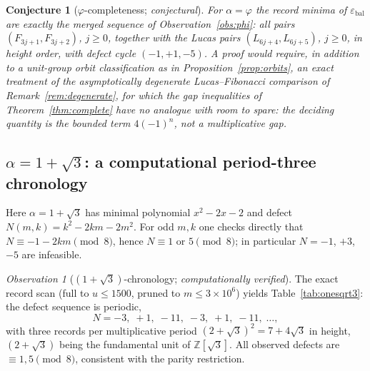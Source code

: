 \documentclass[11pt]{article}
\newtheorem{conjecture}[theorem]{Conjecture}
\theoremstyle{definition}
\theoremstyle{remark}
\newtheorem{observation}[theorem]{Observation}
\newcommand{\eb}{\varepsilon_{\mathrm{bal}}}
\newcommand{\ZZ}{\mathbb{Z}}
\begin{document}
\begin{conjecture}[$\varphi$-completeness; \emph{conjectural}]\label{conj:phi}
For $\alpha=\varphi$ the record minima of $\eb$ are exactly the merged sequence of Observation~\ref{obs:phi}: all pairs $(F_{3j+1},F_{3j+2})$, $j\ge0$, together with the Lucas pairs $(L_{6j+4},L_{6j+5})$, $j\ge0$, in height order, with defect cycle $(-1,+1,-5)$. A proof would require, in addition to a unit-group orbit classification as in Proposition~\ref{prop:orbits}, an exact treatment of the asymptotically degenerate Lucas--Fibonacci comparison of Remark~\ref{rem:degenerate}, for which the gap inequalities of Theorem~\ref{thm:complete} have no analogue with room to spare: the deciding quantity is the bounded term $4(-1)^n$, not a multiplicative gap.
\end{conjecture}

\subsection{$\alpha=1+\sqrt3$: a computational period-three chronology}\label{sec:onesqrt3}

Here $\alpha=1+\sqrt3$ has minimal polynomial $x^2-2x-2$ and defect $N(m,k)=k^2-2km-2m^2$. For odd $m,k$ one checks directly that $N\equiv-1-2km\pmod 8$, hence $N\equiv1$ or $5\pmod 8$; in particular $N=-1$, $+3$, $-5$ are infeasible.

\begin{observation}[$(1+\sqrt3)$-chronology; \emph{computationally verified}]\label{obs:sqrt3}
The exact record scan (full to $u\le1500$, pruned to $m\le3\times10^6$) yields Table~\ref{tab:onesqrt3}: the defect sequence is periodic,
\[
N=-3,\;+1,\;-11,\;-3,\;+1,\;-11,\;\dots,
\]
with three records per multiplicative period $(2+\sqrt3)^2=7+4\sqrt3$ in height, $(2+\sqrt3)$ being the fundamental unit of $\ZZ[\sqrt3]$. All observed defects are $\equiv1,5\pmod 8$, consistent with the parity restriction.
\end{observation}
\end{document}
